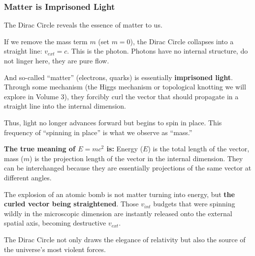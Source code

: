 \subsubsection{Matter is Imprisoned Light}

The Dirac Circle reveals the essence of matter to us.

If we remove the mass term $m$ (set $m=0$), the Dirac Circle collapses into a straight line: $v_{ext} = c$. This is the photon. Photons have no internal structure, do not linger here, they are pure flow.

And so-called ``matter'' (electrons, quarks) is essentially \textbf{imprisoned light}. Through some mechanism (the Higgs mechanism or topological knotting we will explore in Volume 3), they forcibly curl the vector that should propagate in a straight line into the internal dimension.

Thus, light no longer advances forward but begins to spin in place. This frequency of ``spinning in place'' is what we observe as ``mass.''

\textbf{The true meaning of $E=mc^2$ is:} Energy ($E$) is the total length of the vector, mass ($m$) is the projection length of the vector in the internal dimension. They can be interchanged because they are essentially projections of the same vector at different angles.

The explosion of an atomic bomb is not matter turning into energy, but \textbf{the curled vector being straightened}. Those $v_{int}$ budgets that were spinning wildly in the microscopic dimension are instantly released onto the external spatial axis, becoming destructive $v_{ext}$.

The Dirac Circle not only draws the elegance of relativity but also the source of the universe's most violent forces.

